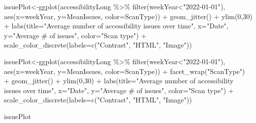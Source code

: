 \documentclass[
]{article}
\newenvironment{Shaded}{\begin{snugshade}}{\end{snugshade}}
\newcommand{\AttributeTok}[1]{\textcolor[rgb]{0.77,0.63,0.00}{#1}}
\newcommand{\DecValTok}[1]{\textcolor[rgb]{0.00,0.00,0.81}{#1}}
\newcommand{\FunctionTok}[1]{\textcolor[rgb]{0.00,0.00,0.00}{#1}}
\newcommand{\NormalTok}[1]{#1}
\newcommand{\OtherTok}[1]{\textcolor[rgb]{0.56,0.35,0.01}{#1}}
\newcommand{\SpecialCharTok}[1]{\textcolor[rgb]{0.00,0.00,0.00}{#1}}
\newcommand{\StringTok}[1]{\textcolor[rgb]{0.31,0.60,0.02}{#1}}
\begin{document}
\begin{Shaded}
\begin{Highlighting}[]
\NormalTok{issuePlot}\OtherTok{\textless{}{-}}\FunctionTok{ggplot}\NormalTok{(accessibilityLong }\SpecialCharTok{\%\textgreater{}\%} \FunctionTok{filter}\NormalTok{(weekYear}\SpecialCharTok{\textless{}}\StringTok{"2022{-}01{-}01"}\NormalTok{),}
  \FunctionTok{aes}\NormalTok{(}\AttributeTok{x=}\NormalTok{weekYear, }\AttributeTok{y=}\NormalTok{MeanIssues, }\AttributeTok{color=}\NormalTok{ScanType)) }\SpecialCharTok{+}
  \FunctionTok{geom\_jitter}\NormalTok{() }\SpecialCharTok{+}
  \FunctionTok{ylim}\NormalTok{(}\DecValTok{0}\NormalTok{,}\DecValTok{30}\NormalTok{) }\SpecialCharTok{+}
  \FunctionTok{labs}\NormalTok{(}\AttributeTok{title=}\StringTok{"Average number of accessibility issues over time"}\NormalTok{,}
       \AttributeTok{x=}\StringTok{"Date"}\NormalTok{, }\AttributeTok{y=}\StringTok{"Average \# of issues"}\NormalTok{, }\AttributeTok{color=}\StringTok{"Scan type"}\NormalTok{) }\SpecialCharTok{+}
  \FunctionTok{scale\_color\_discrete}\NormalTok{(}\AttributeTok{labels=}\FunctionTok{c}\NormalTok{(}\StringTok{"Contrast"}\NormalTok{, }\StringTok{"HTML"}\NormalTok{, }\StringTok{"Image"}\NormalTok{))}

\NormalTok{issuePlot}\OtherTok{\textless{}{-}}\FunctionTok{ggplot}\NormalTok{(accessibilityLong }\SpecialCharTok{\%\textgreater{}\%} \FunctionTok{filter}\NormalTok{(weekYear}\SpecialCharTok{\textless{}}\StringTok{"2022{-}01{-}01"}\NormalTok{),}
  \FunctionTok{aes}\NormalTok{(}\AttributeTok{x=}\NormalTok{weekYear, }\AttributeTok{y=}\NormalTok{MeanIssues, }\AttributeTok{color=}\NormalTok{ScanType)) }\SpecialCharTok{+}
  \FunctionTok{facet\_wrap}\NormalTok{(}\StringTok{"ScanType"}\NormalTok{) }\SpecialCharTok{+}
  \FunctionTok{geom\_jitter}\NormalTok{() }\SpecialCharTok{+}
  \FunctionTok{ylim}\NormalTok{(}\DecValTok{0}\NormalTok{,}\DecValTok{30}\NormalTok{) }\SpecialCharTok{+}
  \FunctionTok{labs}\NormalTok{(}\AttributeTok{title=}\StringTok{"Average number of accessibility issues over time"}\NormalTok{,}
       \AttributeTok{x=}\StringTok{"Date"}\NormalTok{, }\AttributeTok{y=}\StringTok{"Average \# of issues"}\NormalTok{, }\AttributeTok{color=}\StringTok{"Scan type"}\NormalTok{) }\SpecialCharTok{+}
  \FunctionTok{scale\_color\_discrete}\NormalTok{(}\AttributeTok{labels=}\FunctionTok{c}\NormalTok{(}\StringTok{"Contrast"}\NormalTok{, }\StringTok{"HTML"}\NormalTok{, }\StringTok{"Image"}\NormalTok{))}


\NormalTok{issuePlot}
\end{Highlighting}
\end{Shaded}
\end{document}
